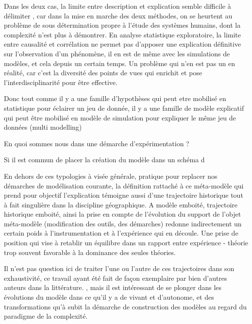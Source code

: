 {Dans les deux cas, la limite entre description et explication semble difficile à délimiter \autocite{Sanders2000}, car dans la mise en marche des deux méthodes, on se heurtent au problème de sous détermination propre à l'étude des systèmes humains, dont la complexité n'est plus à démontrer. En analyse statistique exploratoire, la limite entre causalité et corrélation ne permet pas d'apposer une explication définitive sur l'observation d'un phénomène, il en est de même avec les simulations de modèles, et cela depuis un certain temps. Un problème qui n'en est pas un en réalité, car c'est la diversité des points de vues qui enrichit et pose l'interdisciplinarité pour être effective.

Donc tout comme il y a une famille d'hypothèses qui peut etre mobilisé en statistique pour éclairer un jeu de donnée, il y a une famille de modèle explicatif qui peut être mobilisé en modèle de simulation pour expliquer le même jeu de données (multi modelling)



En quoi sommes nous dans une démarche d'expérimentation ? 

Si il est commun de placer la création du modèle dans un schéma d


En dehors de ces typologies à visée générale, pratique pour replacer nos démarches de modélisation courante, la définition rattaché à ce méta-modèle qui prend pour objectif l'explication témoigne aussi d'une trajectoire historique tout à fait singulière dans la discipline géographique. A modèle emboité, trajectoire historique emboité, ainsi la prise en compte de l'évolution du support de l'objet méta-modèle (modification des outils, des démarches) redonne indirectement un certain poids à l'instrumentation et à l'expérience qui en découle. Une prise de position qui vise à retablir un équilibre dans un rapport entre expérience - théorie trop souvent favorable à la dominance des seules théories.

Il n'est pas question ici de traiter l'une ou l'autre de ces trajectoires dans son exhaustivité, ce travail ayant été fait de façon exemplaire par bien d'autres auteurs dans la littérature. \autocite{Louail2010} \autocite{Banos2013a} \autocite{Pumain2002}, mais il est intéressant de se plonger dans les évolutions du modèle dans ce qu'il y a de vivant et d'autonome, et des transformations qu'à subit la démarche de construction des modèles au regard du paradigme de la complexité.


}
